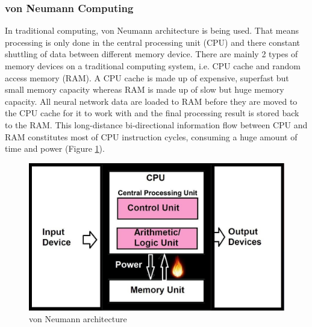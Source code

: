 \subsubsection{von Neumann Computing}
In traditional computing, von Neumann architecture is being used. That means processing is only done in the central processing unit (CPU) and there constant shuttling of data between different memory device. There are mainly 2 types of memory devices on a traditional computing system, i.e. CPU cache and random access memory (RAM). A CPU cache is made up of expensive, superfast but small memory capacity whereas RAM is made up of slow but huge memory capacity. All neural network data are loaded to RAM before they are moved to the CPU cache for it to work with and the final processing result is stored back to the RAM. This long-distance bi-directional information flow between CPU and RAM constitutes most of CPU instruction cycles, consuming a huge amount of time and power (Figure \ref{fig:vonneumann}).
\begin{figure}[H]
	\centering
	\includegraphics[scale=0.4]{vonneumann.jpg}
	\caption{von Neumann architecture}
	\label{fig:vonneumann}
\end{figure}

